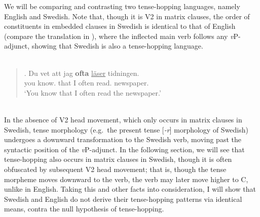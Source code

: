 We will be comparing and contrasting two tense-hopping languages, namely English and Swedish. Note that, though it is V2 in matrix clauses, the order of constituents in embedded clauses in Swedish is identical to that of English (compare the translation in \Next), where the inflected main verb follows any \textit{v}P-adjunct, showing that Swedish is also a tense-hopping language.
\\\\
\begin{minipage}{5.5in}
\singlespacing
\begin{quote}
\exg. Du vet att 	jag \textbf{ofta} \underline{l\"{a}ser} tidningen.\\
you know. that I often read. newspaper.\\
`You know that I often read the newspaper.'\\

\end{quote}
\onehalfspacing
\end{minipage}
\\In the absence of V2 head movement, which only occurs in matrix clauses in Swedish, tense morphology (e.g.\ the present tense [{\it -r}] morphology of Swedish) undergoes a downward transformation to the Swedish verb, moving past the syntactic position of the {\it v}P-adjunct. In the following section, we will see that tense-hopping also occurs in matrix clauses in Swedish, though it is often obfuscated by subsequent V2 head movement; that is, though the tense morpheme moves downward to the verb, the verb may later move higher to C, unlike in English. Taking this and other facts into consideration, I will show that Swedish and English do not derive their tense-hopping patterns via identical means, contra the null hypothesis of tense-hopping.

